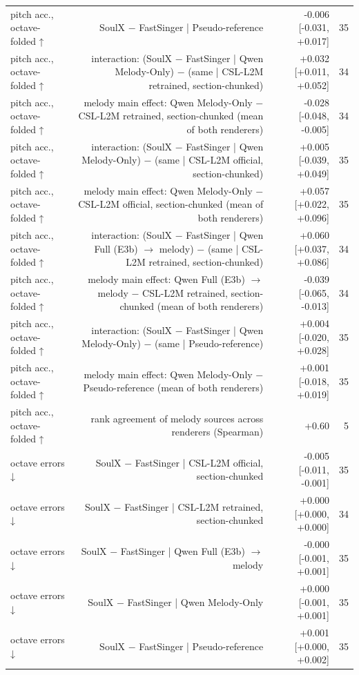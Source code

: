 \begin{table}[t]
\begin{tabular}{lrrr}
pitch acc., octave-folded ↑ & SoulX $-$ FastSinger | Pseudo-reference & -0.006 [-0.031, +0.017] & 35 \\
pitch acc., octave-folded ↑ & interaction: (SoulX $-$ FastSinger | Qwen Melody-Only) $-$ (same | CSL-L2M retrained, section-chunked) & +0.032 [+0.011, +0.052] & 34 \\
pitch acc., octave-folded ↑ & melody main effect: Qwen Melody-Only $-$ CSL-L2M retrained, section-chunked (mean of both renderers) & -0.028 [-0.048, -0.005] & 34 \\
pitch acc., octave-folded ↑ & interaction: (SoulX $-$ FastSinger | Qwen Melody-Only) $-$ (same | CSL-L2M official, section-chunked) & +0.005 [-0.039, +0.049] & 35 \\
pitch acc., octave-folded ↑ & melody main effect: Qwen Melody-Only $-$ CSL-L2M official, section-chunked (mean of both renderers) & +0.057 [+0.022, +0.096] & 35 \\
pitch acc., octave-folded ↑ & interaction: (SoulX $-$ FastSinger | Qwen Full (E3b) $\rightarrow$ melody) $-$ (same | CSL-L2M retrained, section-chunked) & +0.060 [+0.037, +0.086] & 34 \\
pitch acc., octave-folded ↑ & melody main effect: Qwen Full (E3b) $\rightarrow$ melody $-$ CSL-L2M retrained, section-chunked (mean of both renderers) & -0.039 [-0.065, -0.013] & 34 \\
pitch acc., octave-folded ↑ & interaction: (SoulX $-$ FastSinger | Qwen Melody-Only) $-$ (same | Pseudo-reference) & +0.004 [-0.020, +0.028] & 35 \\
pitch acc., octave-folded ↑ & melody main effect: Qwen Melody-Only $-$ Pseudo-reference (mean of both renderers) & +0.001 [-0.018, +0.019] & 35 \\
pitch acc., octave-folded ↑ & rank agreement of melody sources across renderers (Spearman) & +0.60 & 5 \\
octave errors ↓ & SoulX $-$ FastSinger | CSL-L2M official, section-chunked & -0.005 [-0.011, -0.001] & 35 \\
octave errors ↓ & SoulX $-$ FastSinger | CSL-L2M retrained, section-chunked & +0.000 [+0.000, +0.000] & 34 \\
octave errors ↓ & SoulX $-$ FastSinger | Qwen Full (E3b) $\rightarrow$ melody & -0.000 [-0.001, +0.001] & 35 \\
octave errors ↓ & SoulX $-$ FastSinger | Qwen Melody-Only & +0.000 [-0.001, +0.001] & 35 \\
octave errors ↓ & SoulX $-$ FastSinger | Pseudo-reference & +0.001 [+0.000, +0.002] & 35 \\

\end{tabular}
\end{table}
